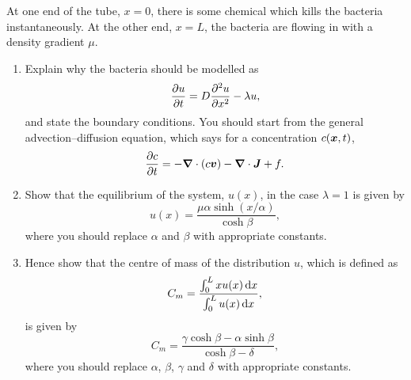 \documentclass[a4paper,12pt]{article}
\begin{document}
\begin{enumerate}
{      At one end of the tube, $x=0$, there is some chemical which kills the bacteria instantaneously. At the other end, $x=L$, the bacteria are flowing in with a density gradient $\mu$.
      \begin{enumerate}
        \item{Explain why the bacteria should be modelled as
            \begin{equation}
              \pd{u}{t} = D\pdd{u}{x}-\lambda u,
            \end{equation}
            and state the boundary conditions. You should start from the general advection--diffusion equation, which says for a concentration $c(\v{x},t)$,
            \begin{equation}
            	\pd{c}{t} = -\vnabla\cdot(c \v{v})-\vnabla \cdot \v{J} + f.
            \end{equation}
          }
        \item Show that the equilibrium of the system, $u(x)$, in the case $\lambda=1$ is given by
          \begin{equation}
            u(x) = \frac{\mu\alpha \sinh(x/\alpha)}{\cosh\beta},
          \end{equation}
          where you should replace $\alpha$ and $\beta$ with appropriate constants.

        \item Hence show that the centre of mass of the distribution $u$, which is defined as
          \begin{equation}
            C_m = \frac{\int_{0}^{L}x u(x) \, {\mathrm d}{x}}{\int_{0}^{L}u(x) \, {\mathrm d}{x}},
          \end{equation}
          is given by
          \begin{equation}
            C_m = \frac{\gamma \cosh\beta - \alpha \sinh\beta}{\cosh\beta-\delta},
          \end{equation}
          where you should replace $\alpha$, $\beta$, $\gamma$ and $\delta$ with appropriate constants.


\end{enumerate}}
\end{enumerate}
\end{document}

